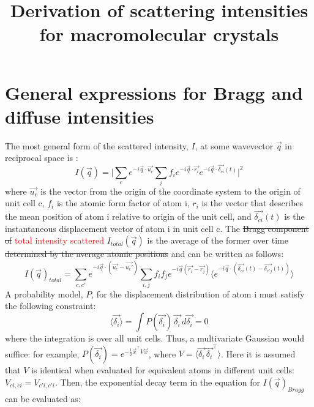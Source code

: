 \documentclass{article}
\title{Derivation of scattering intensities for macromolecular crystals}
\begin{document}
\maketitle

\tableofcontents

\newpage
\section{General expressions for Bragg and diffuse intensities}
The most general form of the scattered intensity, $I$, at some wavevector $\vec{q}$ in reciprocal space is \textcolor{red}{\cite{pmid19836331}}:
\begin{equation}
I(\vec{q}) = \vert \sum\limits_{c} e^{-i \vec{q} \cdot \vec{u_c} } \sum\limits_{i} f_i e^{-i \vec{q} \cdot \vec{r_i}} e^{-i \vec{q} \cdot \vec{\delta_{ci}}(t)} \vert ^2
\end{equation}
where $\vec{u_c}$ is the vector from the origin of the coordinate system to the origin of unit cell c, $f_i$ is the atomic form factor of atom i, $r_i$ is the vector that describes the mean position of atom i relative to origin of the unit cell, and $\vec{\delta_{ci}}(t)$ is the instantaneous displacement vector of atom i in unit cell c. The \sout{Bragg component of} \textcolor{red}{total intensity scattered} $I_{total}(\vec{q})$ is the average of the former over time \sout{determined by the average atomic positions} and can be written as follows:
\begin{equation}
I(\vec{q})_{total} = \sum\limits_{c,c'} e^{-i \vec{q} \cdot (\vec{u_c} - \vec{u_c'})} \sum\limits_{i,j} f_i f_j e^{-i \vec{q} (\vec{r_i} - \vec{r_j})} \langle e^{-i \vec{q} \cdot (\vec{\delta_{ci}}(t) - \vec{\delta_{c'j}}(t))} \rangle
\end{equation}
A probability model, $P$, for the displacement distribution of atom i must satisfy the following constraint:
\begin{equation}
\langle \vec{\delta_{i}} \rangle = \int P(\vec{\delta_{i}})\, \vec{\delta_{i}} \, d\vec{\delta_{i}} = 0
\end{equation}
where the integration is over all unit cells. Thus, a multivariate Gaussian would suffice: for example, $P(\vec{\delta_{i}}) =e^{-\frac{1}{2} \vec{x}^\intercal V \vec{x}}$, where $V = \langle \vec{\delta_{i}} \, \vec{\delta_{i}}^\intercal \rangle$. Here it is assumed that $V$ is identical when evaluated for equivalent atoms in different unit cells: $V_{ci,ci} = V_{c'i,c'i}$.
Then, the exponential decay term in the equation for $I(\vec{q})_{Bragg}$ can be evaluated as\footnotemark:
\end{document}
